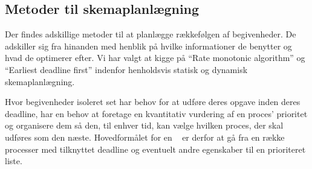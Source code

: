 


\subsection{Metoder til skemaplanlægning}
Der findes adskillige metoder til at planlægge rækkefølgen af begivenheder. De adskiller sig fra hinanden med henblik på hvilke informationer de benytter og hvad de optimerer efter. Vi har valgt at kigge på ``Rate monotonic algorithm''\cite{lehoczky1989rate,liu1973scheduling} og ``Earliest deadline first''\cite{liu1973scheduling} indenfor henholdsvis statisk og dynamisk skemaplanlægning.

Hvor begivenheder isoleret set har behov for at udføre deres opgave inden deres deadline, har \sched en behov at foretage en kvantitativ vurdering af en proces' prioritet og organisere dem så den, til enhver tid, kan vælge hvilken proces, der skal udføres som den næste. Hovedformålet for en  \sched ~ er derfor at gå fra en række processer med tilknyttet deadline og eventuelt andre egenskaber til en prioriteret liste. 

